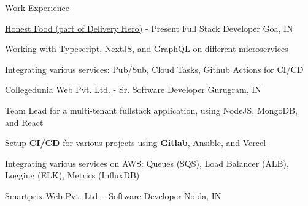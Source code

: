 \documentclass[../resume.tex]{subfiles}
\begin{document}

\begin{rSection}{Work Experience}
    \begin{rSubsection}
        {\href{https://www.honestfoodcompany.de/}{Honest Food (part of Delivery Hero)}}
        {  - Present }
        {Full Stack Developer}
        {Goa, IN}

        \item Working with Typescript, NextJS, and GraphQL on different microservices
        \item Integrating various services: Pub/Sub, Cloud Tasks, Github Actions for CI/CD

    \end{rSubsection}

    \begin{rSubsection}
        {\href{https://collegedunia.com}{Collegedunia Web Pvt. Ltd.}}
        {  -  }
        {Sr. Software Developer}
        {Gurugram, IN}

        \item Team Lead for a multi-tenant fullstack application, using NodeJS, MongoDB, and React
        \item Setup \textbf{CI/CD} for various projects using \textbf{Gitlab}, Ansible, and Vercel
        \item Integrating various services on AWS: Queues (SQS), Load Balancer (ALB), Logging (ELK), Metrics (InfluxDB)

    \end{rSubsection}

    \begin{rSubsection}
        {\href{https://www.smartprix.com}{Smartprix Web Pvt. Ltd.}}
        {  -  }
        {Software Developer}
        {Noida, IN}


\end{rSubsection}
\end{rSection}
\end{document}
